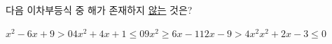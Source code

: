 다음 이차부등식 중 해가 존재하지 \underline{않는} 것은?
\begin{choicesii}{$x^2-6x+9>0$}{$4x^2+4x+1\le 0$}{$9x^2\ge 6x-1$}{$12x-9>4x^2$}{$x^2+2x-3\le 0$}\end{choicesii}
